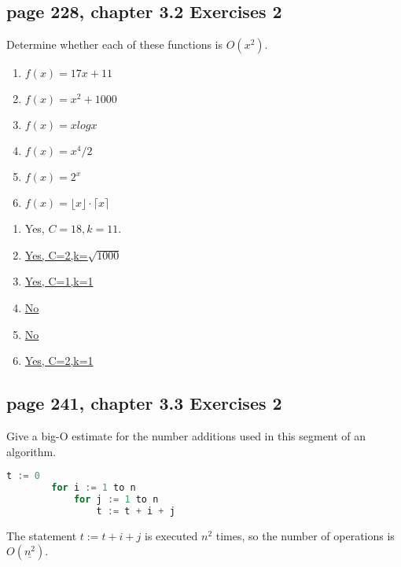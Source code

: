 \documentclass[sigconf]{acmart}
\begin{document}
\subsection{page 228, chapter 3.2 Exercises 2}
\begin{shaded}
    Determine whether each of these functions is $O(x^2)$.
    \begin{enumerate}[label=(\alph*)]
    	\item $f(x) = 17x + 11$
    	\item $f(x) = x^2 + 1000$
    	\item $f(x) = x log x$
    	\item $f(x) = x^4 / 2$
    	\item $f(x) = 2^x$
    	\item $f(x) = \lfloor x \rfloor \cdot \lceil x \rceil$
    \end{enumerate}
\end{shaded}
\begin{enumerate}[label=(\alph*)]
	\item Yes, $C = 18, k = 11$.
	\item \underline{Yes, C=2,k=$\sqrt {1000}$}
	\item \underline{Yes, C=1,k=1}
	\item \underline{No}
	\item \underline{No}
	\item \underline{Yes, C=2,k=1}
\end{enumerate}


\subsection{page 241, chapter 3.3 Exercises 2}
\begin{shaded}
    Give a big-O estimate for the number additions used in this segment of an algorithm.
    \begin{lstlisting}[language={python}]
        t := 0
        for i := 1 to n
            for j := 1 to n
                t := t + i + j
    \end{lstlisting}
\end{shaded}
The statement $t := t + i + j$ is executed \underline{$n^2$} times, so the number of operations is $O(\underline{n^2})$.


\clearpage

\vspace{20cm}
\end{document}
